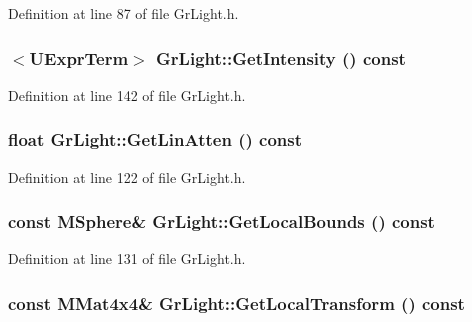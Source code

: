 Definition at line 87 of file GrLight.h.\hypertarget{class_gr_light_d2a8c86c04413bcf5069fc6611b706db}{
\subsubsection[{GetIntensity}]{$<${\bf UExprTerm}$>$ GrLight::GetIntensity () const}}
\label{class_gr_light_d2a8c86c04413bcf5069fc6611b706db}




Definition at line 142 of file GrLight.h.\hypertarget{class_gr_light_6139a06b502ca8e493b2ce5bb374f9aa}{
\subsubsection[{GetLinAtten}]{\setlength{\rightskip}{0pt plus 5cm}float GrLight::GetLinAtten () const}}
\label{class_gr_light_6139a06b502ca8e493b2ce5bb374f9aa}




Definition at line 122 of file GrLight.h.\hypertarget{class_gr_light_4b3c3516b76319d07e2a8558ee3e9183}{
\subsubsection[{GetLocalBounds}]{\setlength{\rightskip}{0pt plus 5cm}const {\bf MSphere}\& GrLight::GetLocalBounds () const}}
\label{class_gr_light_4b3c3516b76319d07e2a8558ee3e9183}




Definition at line 131 of file GrLight.h.\hypertarget{class_gr_light_18c9bdf63222395136bb181b5d9f0a9d}{
\subsubsection[{GetLocalTransform}]{\setlength{\rightskip}{0pt plus 5cm}const {\bf MMat4x4}\& GrLight::GetLocalTransform () const}}
\label{class_gr_light_18c9bdf63222395136bb181b5d9f0a9d}




